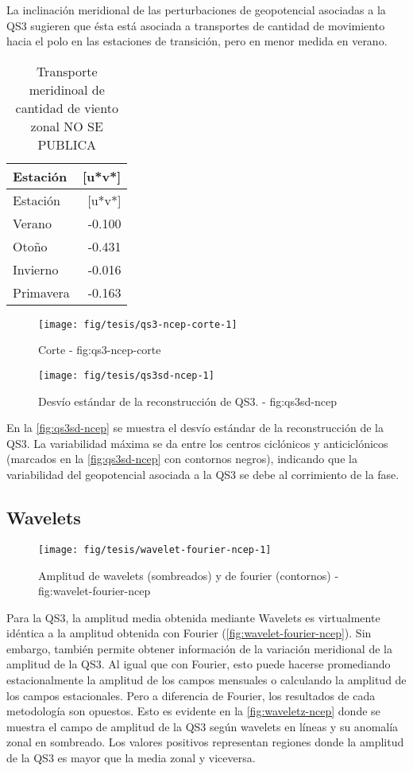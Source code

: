 \documentclass[spanish,a4paper]{book}
\begin{document}
La inclinación meridional de las perturbaciones de geopotencial
asociadas a la QS3 sugieren que ésta está asociada a transportes de
cantidad de movimiento hacia el polo en las estaciones de transición,
pero en menor medida en verano.

\begin{longtable}[]{@{}lr@{}}
\caption{Transporte meridinoal de cantidad de viento zonal NO SE
PUBLICA}\tabularnewline
\toprule
Estación & {[}u*v*{]}\tabularnewline
\midrule
\endfirsthead
\toprule
Estación & {[}u*v*{]}\tabularnewline
\midrule
\endhead
Verano & -0.100\tabularnewline
Otoño & -0.431\tabularnewline
Invierno & -0.016\tabularnewline
Primavera & -0.163\tabularnewline
\bottomrule
\end{longtable}

\begin{figure*}
\texttt{[image: fig/tesis/qs3-ncep-corte-1]} \caption{Corte - fig:qs3-ncep-corte}\label{fig:qs3-ncep-corte}
\end{figure*}

\begin{figure*}
\texttt{[image: fig/tesis/qs3sd-ncep-1]} \caption{Desvío estándar de la reconstrucción de QS3. - fig:qs3sd-ncep}\label{fig:qs3sd-ncep}
\end{figure*}

En la \autoref{fig:qs3sd-ncep} se muestra el desvío estándar de la
reconstrucción de la QS3. La variabilidad máxima se da entre los centros
ciclónicos y anticiclónicos (marcados en la \autoref{fig:qs3sd-ncep} con
contornos negros), indicando que la variabilidad del geopotencial
asociada a la QS3 se debe al corrimiento de la fase.


\subsection{Wavelets}\label{wavelets}

\begin{figure}

{\centering \texttt{[image: fig/tesis/wavelet-fourier-ncep-1]} 

}

\caption{Amplitud de wavelets (sombreados) y de fourier (contornos) - fig:wavelet-fourier-ncep}\label{fig:wavelet-fourier-ncep}
\end{figure}

Para la QS3, la amplitud media obtenida mediante Wavelets
 es virtualmente idéntica a la
amplitud obtenida con Fourier (\autoref{fig:wavelet-fourier-ncep}). Sin
embargo, también permite obtener información de la variación meridional
de la amplitud de la QS3. Al igual que con Fourier, esto puede hacerse
promediando estacionalmente la amplitud de los campos mensuales o
calculando la amplitud de los campos estacionales. Pero a diferencia de
Fourier, los resultados de cada metodología son opuestos. Esto es
evidente en la \autoref{fig:waveletz-ncep} donde se muestra el campo de
amplitud de la QS3 según wavelets en líneas y su anomalía zonal en
sombreado. Los valores positivos representan regiones donde la amplitud
de la QS3 es mayor que la media zonal y viceversa.
\end{document}
